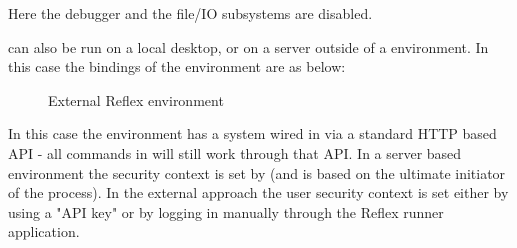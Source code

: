 Here the debugger and the file/IO subsystems are disabled.

\Reflex can also be run on a local desktop, or on a server outside of a \Rapture environment. In this case the bindings of the environment are as below:
\begin{figure}[H]
\centering
{}
\caption { External Reflex environment }
\end{figure}

In this case the environment has a \Rapture system wired in via a standard HTTP based API - all \Rapture commands in \Reflex will still work through that API. In a server based environment the security context is set by \Rapture (and is based on the ultimate initiator of the \Reflex process). In the external approach the user security context is set either by using a \Rapture "API key" or by logging in manually through the Reflex runner application.
